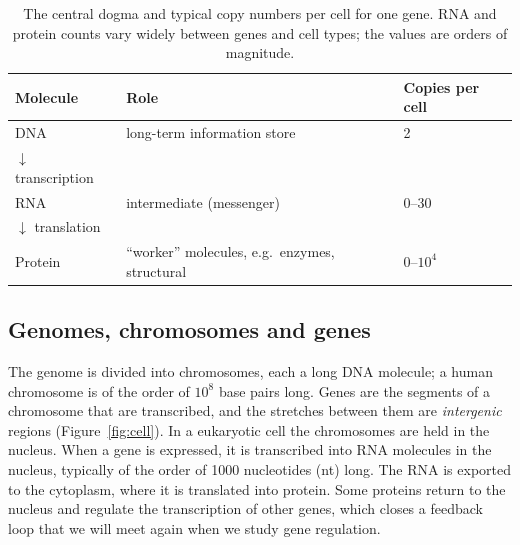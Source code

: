 \begin{table}[t]
  \centering
  \caption{The central dogma and typical copy numbers per cell for one gene. RNA and protein counts vary widely between genes and cell types; the values are orders of magnitude.}
  \label{tab:central_dogma}
  \begin{tabular}{lll}
    \toprule
    Molecule & Role & Copies per cell \\
    \midrule
    DNA & long-term information store & 2 \\
    \quad $\downarrow$ transcription & & \\
    RNA & intermediate (messenger) & 0--30 \\
    \quad $\downarrow$ translation & & \\
    Protein & ``worker'' molecules, e.g.\ enzymes, structural & 0--$10^4$ \\
    \bottomrule
  \end{tabular}
\end{table}

\subsection{Genomes, chromosomes and genes}

The genome is divided into chromosomes, each a long DNA molecule; a human chromosome is of the order of $10^8$ base pairs long. Genes are the segments of a chromosome that are transcribed, and the stretches between them are \emph{intergenic} regions (Figure~\ref{fig:cell}). In a eukaryotic cell the chromosomes are held in the nucleus. When a gene is expressed, it is transcribed into RNA molecules in the nucleus, typically of the order of 1000 nucleotides (nt) long. The RNA is exported to the cytoplasm, where it is translated into protein. Some proteins return to the nucleus and regulate the transcription of other genes, which closes a feedback loop that we will meet again when we study gene regulation.

